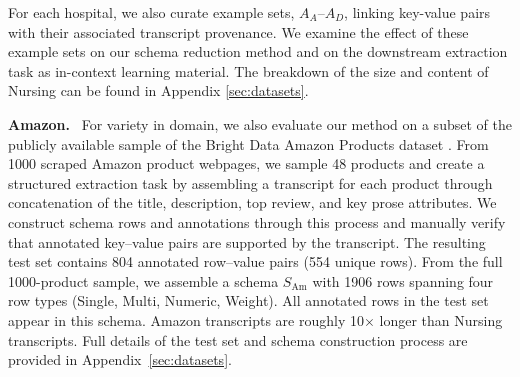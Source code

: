 \documentclass[11pt]{article}
\begin{document}
For each hospital, we also curate example sets, $A_{A}$--$A_{D}$, linking key-value pairs with their associated transcript provenance. 
We examine the effect of these example sets on our schema reduction method and on the downstream extraction task as in-context learning material. The breakdown of the size and content of Nursing can be found in Appendix \ref{sec:datasets}.

\textbf{Amazon.}~ For variety in domain, we also evaluate our method on a subset of the publicly available sample of the Bright Data Amazon Products dataset \cite{brightdata2025}. 
From 1000 scraped Amazon product webpages, we sample 48 products and 
create a structured extraction task by assembling a transcript for each product through concatenation of the title, description, top review, and key prose attributes. We construct schema rows and annotations through this process and 
manually verify that annotated key–value pairs are supported by the transcript. The resulting test set contains 804 annotated row–value pairs (554 unique rows). 
From the full 1000-product sample, we assemble a schema $S_{\mathrm{Am}}$ with 1906 rows spanning four row types (Single, Multi, Numeric, Weight). All annotated rows in the test set appear in this schema. Amazon transcripts are roughly 10$\times$ longer than Nursing transcripts. 
Full details of the test set and schema construction process are provided in Appendix~\ref{sec:datasets}.
\end{document}
